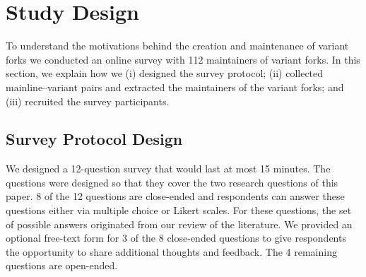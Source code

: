 \section{Study Design}
\label{sec:study_design}

To understand the motivations behind the creation and maintenance of variant forks we conducted an online survey with 112 maintainers of variant forks. In this section, we explain how we (i) designed the survey protocol; (ii) collected mainline--variant pairs and extracted the maintainers of the variant forks; and (iii) recruited the survey participants.


\subsection{Survey Protocol Design}
\label{sec:protocal}

We designed a 12-question survey that would last at most 15 minutes.
 
The questions were designed so that they cover the two research questions of this paper.
8 of the 12 questions are close-ended and respondents can answer these questions either via multiple choice or Likert scales.
For these questions, the set of possible answers originated from our review of the literature.
We provided an optional free-text form for 3 of the 8 close-ended questions to give respondents the opportunity to share additional thoughts and feedback.
The 4 remaining questions are open-ended.

